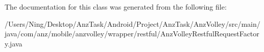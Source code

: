 The documentation for this class was generated from the following file\+:\begin{DoxyCompactItemize}
\item 
/\+Users/\+Ning/\+Desktop/\+Anz\+Task/\+Android/\+Project/\+Anz\+Task/\+Anz\+Volley/src/main/java/com/anz/mobile/anzvolley/wrapper/restful/Anz\+Volley\+Restful\+Request\+Factory.\+java\end{DoxyCompactItemize}
